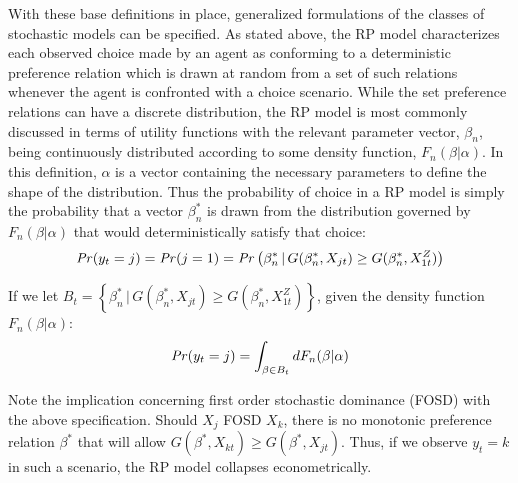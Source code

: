 \documentclass[../main.tex]{subfiles}
\begin{document}
With these base definitions in place, generalized formulations of the classes of stochastic models can be specified.
As stated above, the RP model characterizes each observed choice made by an agent as conforming to a deterministic preference relation which is drawn at random from a set of such relations whenever the agent is confronted with a choice scenario.
While the set preference relations can have a discrete distribution, the RP model is most commonly discussed in terms of utility functions with the relevant parameter vector, $\beta_n$, being continuously distributed according to some density function, $F_n(\beta | \alpha)$.
In this definition, $\alpha$ is a vector containing the necessary parameters to define the shape of the distribution.
Thus the probability of choice in a RP model is simply the probability that a vector $\beta_n^*$ is drawn from the distribution governed by $F_n(\beta | \alpha)$ that would deterministically satisfy that choice:
\begin{equation}
	\label{eq2:RP0}
	{\ensuremath{\mathit{Pr}}}(y_t=j) = {\mathit{Pr}}(j=1) = {\mathit{Pr}}\left( \beta_n^* \,|\, G(\beta_n^*,X_{jt}) \geq G(\beta_n^*,X_{1t}^Z)\right)
\end{equation}

\noindent If we let $ B_t = \left\{ \beta_n^* \,|\, G(\beta_n^*,X_{jt}) \geq G(\beta_n^*,X_{1t}^Z)\right\}$, given the density function $F_n(\beta | \alpha)$:
\begin{equation}
	\label{eq2:RP.f}
	{\ensuremath{\mathit{Pr}}}(y_t=j) = \int_{\beta \in B_t} dF_n(\beta|\alpha)
\end{equation}

Note the implication concerning first order stochastic dominance (FOSD){\footnotemark} with the above specification. Should $X_j$ FOSD $X_k$, there is no monotonic preference relation $\beta^*$ that will allow $G(\beta^*,X_{kt}) \geq G(\beta^*,X_{jt})$.
Thus, if we observe $y_t = k$ in such a scenario, the RP model collapses econometrically.

\addtocounter{footnote}{-1}
\end{document}

